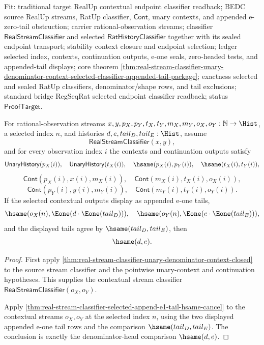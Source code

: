 Fit: traditional target RealUp contextual endpoint classifier readback; BEDC
source RealUp streams, RatUp classifier, $\mathsf{Cont}$, unary contexts, and
appended e-zero-tail obstruction; carrier rational-observation streams;
classifier $\mathsf{RealStreamClassifier}$ and selected
$\mathsf{RatHistoryClassifier}$ together with its sealed endpoint transport;
stability context closure and endpoint selection; ledger selected index,
contexts, continuation outputs, e-one seals, zero-headed tests, and
appended-tail displays; core theorem
\autoref{thm:real-stream-classifier-unary-denominator-context-selected-classifier-appended-tail-package};
exactness selected and sealed RatUp classifiers, denominator/shape rows, and
tail exclusions; standard bridge RegSeqRat selected endpoint classifier
readback; status $\mathsf{ProofTarget}$.

\begin{theorem}
\label{thm:real-stream-classifier-unary-denominator-context-selected-append-e1-tail-hsame-cancel}
For rational-observation streams
$x,y,p_X,p_Y,t_X,t_Y,m_X,m_Y,o_X,o_Y:\mathbb{N}\to\Hist$, a selected
index $n$, and histories $d,e,tail_D,tail_E:\Hist$, assume
$$
\mathsf{RealStreamClassifier}(x,y),
$$
and for every observation index $i$ the contexts and continuation outputs
satisfy
$$
\mathsf{UnaryHistory}(p_X(i)),\quad \mathsf{UnaryHistory}(t_X(i)),\quad
\hsame(p_X(i),p_Y(i)),\quad \hsame(t_X(i),t_Y(i)),
$$
$$
\mathsf{Cont}(p_X(i),x(i),m_X(i)),\quad
\mathsf{Cont}(m_X(i),t_X(i),o_X(i)),
$$
$$
\mathsf{Cont}(p_Y(i),y(i),m_Y(i)),\quad
\mathsf{Cont}(m_Y(i),t_Y(i),o_Y(i)).
$$
If the selected contextual outputs display as appended e-one tails,
$$
\hsame(o_X(n),\Eone(d\cdot\Eone(tail_D))),\quad
\hsame(o_Y(n),\Eone(e\cdot\Eone(tail_E))),
$$
and the displayed tails agree by $\hsame(tail_D,tail_E)$, then
$$
\hsame(d,e).
$$
\end{theorem}
\begin{proof}
First apply
\autoref{thm:real-stream-classifier-unary-denominator-context-closed} to the
source stream classifier and the pointwise unary-context and continuation
hypotheses. This supplies the contextual stream classifier
$\mathsf{RealStreamClassifier}(o_X,o_Y)$.

Apply
\autoref{thm:real-stream-classifier-selected-append-e1-tail-hsame-cancel} to
the contextual streams $o_X,o_Y$ at the selected index $n$, using the two
displayed appended e-one tail rows and the comparison
$\hsame(tail_D,tail_E)$. The conclusion is exactly the denominator-head
comparison $\hsame(d,e)$.
\end{proof}

